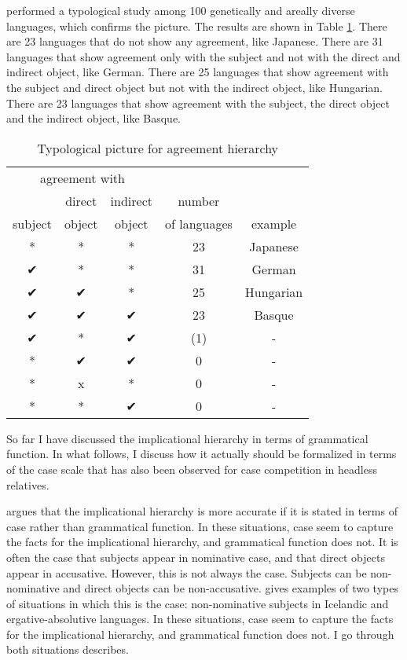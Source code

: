 \citet{gilligan1987} performed a typological study among 100 genetically and areally diverse languages, which confirms the picture. The results are shown in Table \ref{tbl:agr-typo}. There are 23 languages that do not show any agreement, like Japanese. There are 31 languages that show agreement only with the subject and not with the direct and indirect object, like German. There are 25 languages that show agreement with the subject and direct object but not with the indirect object, like Hungarian. There are 23 languages that show agreement with the subject, the direct object and the indirect object, like Basque.

 \begin{table}[ht]
   \center
   \caption {Typological picture for agreement hierarchy \citep{gilligan1987}}
     \begin{tabular}[t]{ccccc}
       \toprule
           \multicolumn{3}{c}{agreement with} &              &         \\
       \cmidrule{1-3}
                    & direct & indirect       & number       &         \\
           subject  & object & object         & of languages & example \\
       \cmidrule{1-3} \cmidrule{4-4} \cmidrule{5-5}
           *    & * & * & 23  & Japanese    \\
           ✔    & * & * & 31  & German     \\
           ✔    & ✔ & * & 25  & Hungarian  \\
           ✔    & ✔ & ✔ & 23  & Basque     \\
           ✔    & * & ✔ & (1) & -          \\
           {*}  & ✔ & ✔ & 0   & -          \\
           {*}  & x & * & 0   & -          \\
           {*}  & * & ✔ & 0   & -          \\
       \bottomrule
     \end{tabular}
     \label{tbl:agr-typo}
 \end{table}

So far I have discussed the implicational hierarchy in terms of grammatical function. In what follows, I discuss how it actually should be formalized in terms of the case scale that has also been observed for case competition in headless relatives.

\citet{bobaljik2006} argues that the implicational hierarchy is more accurate if it is stated in terms of case rather than grammatical function. In these situations, case seem to capture the facts for the implicational hierarchy, and grammatical function does not. It is often the case that subjects appear in nominative case, and that direct objects appear in accusative. However, this is not always the case. Subjects can be non-nominative and direct objects can be non-accusative. \citeauthor{bobaljik2006} gives examples of two types of situations in which this is the case: non-nominative subjects in Icelandic and ergative-absolutive languages. In these situations, case seem to capture the facts for the implicational hierarchy, and grammatical function does not. I go through both situations \citeauthor{bobaljik2006} describes.

